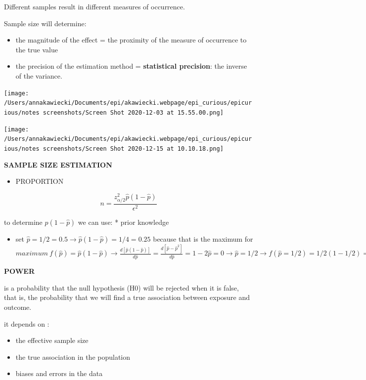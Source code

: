 \documentclass[
]{article}
\providecommand{\tightlist}{%
  \setlength{\itemsep}{0pt}\setlength{\parskip}{0pt}}
\begin{document}
Different samples result in different measures of occurrence.

Sample size will determine:

\begin{itemize}
\item
  the magnitude of the effect = the proximity of the measure of
  occurrence to the true value
\item
  the precision of the estimation method = \textbf{statistical
  precision}: the inverse of the variance.
\end{itemize}

\texttt{[image: /Users/annakawiecki/Documents/epi/akawiecki.webpage/epi\_curious/epicurious/notes screenshots/Screen Shot 2020-12-03 at 15.55.00.png]}

\texttt{[image: /Users/annakawiecki/Documents/epi/akawiecki.webpage/epi\_curious/epicurious/notes screenshots/Screen Shot 2020-12-15 at 10.10.18.png]}

\textbf{SAMPLE SIZE ESTIMATION}

\begin{itemize}
\tightlist
\item
  PROPORTION
\end{itemize}

\[n= \frac{z^2_{\alpha/2}\hat{p}(1-\hat{p})}{\epsilon^2}\]

to determine \(\hat{p}(1-\hat{p})\) we can use: * prior knowledge

\begin{itemize}
\tightlist
\item
  set \(\hat{p}=1/2= 0.5 \to \hat{p}(1-\hat{p}) = 1/4 = 0.25\) because
  that is the maximum for
  \(maximum\:f(\hat{p})=\hat{p}(1-\hat{p}) \to \frac{d[\hat{p}(1-\hat{p})]}{d\hat{p}}= \frac{d[\hat{p}-\hat{p}^2]}{d\hat{p}} = 1-2\hat{p}= 0 \to \hat{p}= 1/2 \to f(\hat{p}= 1/2)=1/2(1-1/2)= 1/4\)
\end{itemize}

\textbf{POWER}

is a probability that the null hypothesis (H0) will be rejected when it
is false, that is, the probability that we will find a true association
between exposure and outcome.

it depends on :

\begin{itemize}
\tightlist
\item
  the effective sample size
\item
  the true association in the population
\item
  biases and errors in the data
\end{itemize}
\end{document}
